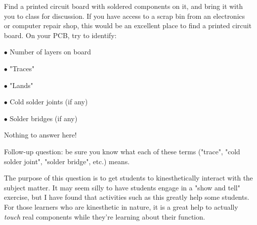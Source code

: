 

Find a printed circuit board with soldered components on it, and bring it with you to class for discussion.  If you have access to a scrap bin from an electronics or computer repair shop, this would be an excellent place to find a printed circuit board.  On your PCB, try to identify:

\medskip
\item{$\bullet$} Number of layers on board
\item{$\bullet$} "Traces"
\item{$\bullet$} "Lands"
\item{$\bullet$} Cold solder joints (if any)
\item{$\bullet$} Solder bridges (if any)
\medskip







Nothing to answer here!

\vskip 10pt

Follow-up question: be sure you know what each of these terms ("trace", "cold solder joint", "solder bridge", etc.) means.







The purpose of this question is to get students to kinesthetically interact with the subject matter.  It may seem silly to have students engage in a "show and tell" exercise, but I have found that activities such as this greatly help some students.  For those learners who are kinesthetic in nature, it is a great help to actually {\it touch} real components while they're learning about their function.




